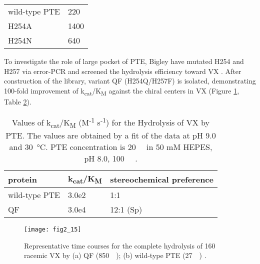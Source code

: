 \begin{refsection}
\begin{table}[htbp]
\begin{tabular}{ll}
    wild-type PTE & 220 \\
    H254A & 1400 \\
    H254N & 640 \\

    \hline  
    \end{tabular}
    \label{tab:GF}
\end{table}

To investigate the role of large pocket of PTE, Bigley  have mutated H254 and H257 via error-PCR and screened the hydrolysis
efficiency toward VX \cite{Tsai2010,Bigley2013}. After construction of
the library, variant QF (H254Q/H257F) is isolated, demonstrating 100-fold
improvement of k\textsubscript{cat}/K\textsubscript{M} against the chiral
centers in VX \cite{Tsai2010} (Figure \ref{fig:pte-vx}, Table
\ref{tab:qf-pte}).
\begin{table}[htbp]
    \centering
    \caption[Values of k\textsubscript{cat}/K\textsubscript{M}
    (M\textsuperscript{-1} s\textsuperscript{-1}) for the Hydrolysis of VX by
    PTE. The values are obtained by a fit of the data at pH 9.0 and
    \SI{30}{\celsius}. PTE concentration is \SI{20}{\nano\Molar} in 50 mM
HEPES, pH 8.0, \SI{100}{\micro\Molar} .] {Values of
    k\textsubscript{cat}/K\textsubscript{M} (M\textsuperscript{-1}
    s\textsuperscript{-1}) for the Hydrolysis of VX by PTE. The values are
    obtained by a fit of the data at pH 9.0 and \SI{30}{\celsius}. PTE
    concentration is \SI{20}{\nano\Molar} in 50 mM HEPES, pH 8.0,
    \SI{100}{\micro\Molar}  \cite{Bigley2013}.}
    \begin{tabular}{lll}
    \hline

    protein & k\textsubscript{cat}/K\textsubscript{M} & stereochemical preference \\
    \hline

    wild-type PTE & 3.0e2 & 1:1 \\
    QF & 3.0e4 & 12:1 (Sp) \\

    \hline  
    \end{tabular} 
    \label{tab:qf-pte}
\end{table}
\begin{figure}[htbp] \centering \texttt{[image: fig2\_15]}
    \caption[Representative time courses for the complete hydrolysis of
    \SI{160}{\micro\Molar} racemic VX by (a) QF (\SI{850}{\nano\Molar}); (b)
wild-type PTE (\SI{27}{\micro\Molar})]{Representative time courses for the
    complete hydrolysis of \SI{160}{\micro\Molar} racemic VX by (a) QF
    (\SI{850}{\nano\Molar}); (b) wild-type PTE (\SI{27}{\micro\Molar})
    \cite{Bigley2013}.}
    \label{fig:pte-vx}
\end{figure}


\end{refsection}
